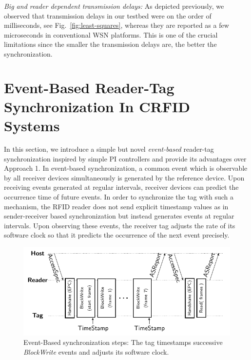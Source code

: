 \documentclass[journal,draftcls,onecolumn,12pt,twoside]{IEEEtranTCOM}
\begin{document}
\emph{Big and reader dependent transmission delays:} As depicted previously, we observed that transmission delays in our testbed were on the order of milliseconds, see Fig.~\ref{fig:least-squares}, whereas they are reported as a few microseconds in conventional WSN platforms. This is one of the crucial limitations since the smaller the transmission delays are, the better the synchronization.

\section{Event-Based Reader-Tag Synchronization In CRFID Systems}\label{sec:event_based}

In this section, we introduce a simple but novel \emph{event-based} reader-tag synchronization inspired by simple PI controllers and provide its advantages over Approach 1. In event-based synchronization, a common event which is observable by all receiver devices simultaneously is generated by the reference device. Upon receiving events generated at regular intervals, receiver devices can predict the occurrence time of future events. In order to synchronize the tag with such a mechanism, the RFID reader does not send explicit timestamp values as in sender-receiver based synchronization but instead generates events at regular intervals. Upon observing these events, the receiver tag adjusts the rate of its software clock so that it predicts the occurrence of the next event precisely. 
\begin{figure}
\centering
\includegraphics[scale=0.8]{figures/Event-Based.pdf}
\caption{\label{fig:event_based}Event-Based synchronization steps: The tag timestamps successive \emph{BlockWrite} events and adjusts its software clock.}
\end{figure}
\end{document}
